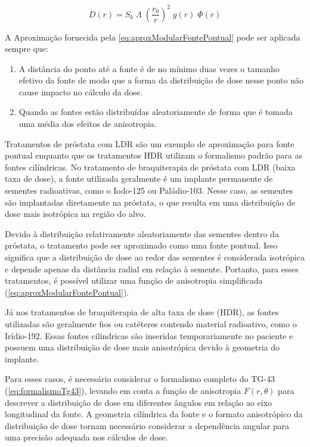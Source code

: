 \documentclass[11pt,a4paper]{article}
\newcounter{exemplo}
\begin{document}
			\begin{equation}
				\dot{D}(r) = S_k \; \varLambda \; \left(\frac{r_0}{r} \right)^2 \; g(r) \; \Phi (r)
				\label{eq:aproxModularFontePontual}
			\end{equation}
			
			A Aproximação fornecida pela   \ref{eq:aproxModularFontePontual} pode ser aplicada sempre que:

			\begin{enumerate}
				\item A distância do ponto até a fonte é de no mínimo duas vezes o tamanho efetivo da fonte de modo que a forma da distribuição de dose nesse ponto não cause impacto no cálculo da dose.
				\item Quando as fontes estão distribuídas aleatoriamente de forma que é tomada uma média dos efeitos de anisotropia.
			\end{enumerate}

			Tratamentos de próstata com LDR são um exemplo de aproximação para fonte pontual enquanto que os tratamentos HDR utilizam o formalismo padrão para as fontes cilíndricas.  No tratamento de braquiterapia de próstata com LDR (baixa taxa de dose), a fonte utilizada geralmente é um implante permanente de sementes radioativas, como o Iodo-125 ou Paládio-103. Nesse caso, as sementes são implantadas diretamente na próstata, o que resulta em uma distribuição de dose mais isotrópica na região do alvo.

			Devido à distribuição relativamente aleatoriamente das sementes dentro da próstata, o tratamento pode ser aproximado como uma fonte pontual. Isso significa que a distribuição de dose ao redor das sementes é considerada isotrópica e depende apenas da distância radial em relação à semente. Portanto, para esses tratamentos, é possível utilizar uma função de anisotropia simplificada (\ref{eq:aproxModularFontePontual}).
			
			Já nos tratamentos de braquiterapia de alta taxa de dose (HDR), as fontes utilizadas são geralmente fios ou catéteres contendo material radioativo, como o Irídio-192. Essas fontes cilíndricas são inseridas temporariamente no paciente e possuem uma distribuição de dose mais anisotrópica devido à geometria do implante.
			
			Para esses casos, é necessário considerar o formalismo completo do TG-43 (\ref{eq:formalismoTg43}), levando em conta a função de anisotropia $F(r, \theta)$ para descrever a distribuição de dose em diferentes ângulos em relação ao eixo longitudinal da fonte. A geometria cilíndrica da fonte e o formato anisotrópico da distribuição de dose tornam necessário considerar a dependência angular para uma precisão adequada nos cálculos de dose.
\end{document}
